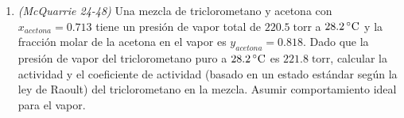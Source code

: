 \documentclass[a4paper,12pt]{article}
\begin{document}
\begin{enumerate}
 \item \textit{(McQuarrie 24-48)} Una mezcla de triclorometano y acetona con $x_{acetona}=0.713$ tiene un presi\'on de vapor total de $220.5\;\mbox{torr}$ a $28.2\,\celsius$ y la fracci\'on molar de la acetona en el vapor es $y_{acetona}=0.818$. Dado que la presi\'on de vapor del triclorometano puro a $28.2\,\celsius$ es $221.8\;\mbox{torr}$, calcular la actividad y el coeficiente de actividad (basado en un estado est\'andar seg\'un la ley de Raoult) del triclorometano en la mezcla. Asumir comportamiento ideal para el vapor.  %






\end{enumerate}
\end{document}
